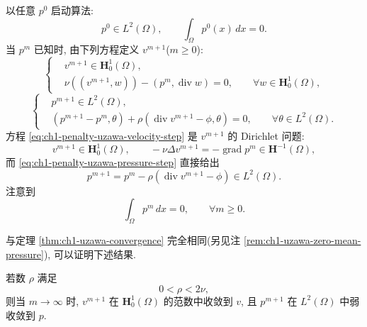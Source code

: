 以任意 $p^0$ 启动算法:
\begin{equation}
p^0\in L^2(\Omega),
\qquad\int_\Omega p^0(x)\,dx=0.
\label{eq:ch1-penalty-algorithm-initial-pressure}
\end{equation}
当 $p^m$ 已知时, 由下列方程定义 $v^{m+1}$($m\geq0$):
\begin{equation}
\left\{
\begin{aligned}
&v^{m+1}\in\mathbf H_0^1(\Omega),\\
&\nu((v^{m+1},w))-(p^m,\operatorname{div}w)=0,
\qquad\forall w\in\mathbf H_0^1(\Omega),
\end{aligned}
\right.
\label{eq:ch1-penalty-uzawa-velocity-step}
\end{equation}
\begin{equation}
\left\{
\begin{aligned}
&p^{m+1}\in L^2(\Omega),\\
&(p^{m+1}-p^m,\theta)
+\rho(\operatorname{div}v^{m+1}-\phi,\theta)=0,
\qquad\forall\theta\in L^2(\Omega).
\end{aligned}
\right.
\label{eq:ch1-penalty-uzawa-pressure-step}
\end{equation}
方程 \eqref{eq:ch1-penalty-uzawa-velocity-step} 是 $v^{m+1}$ 的 Dirichlet 问题:
\begin{equation}
v^{m+1}\in\mathbf H_0^1(\Omega),
\qquad-\nu\Delta v^{m+1}=-\operatorname{grad}p^m
\in\mathbf H^{-1}(\Omega),
\label{eq:ch1-penalty-uzawa-dirichlet-step}
\end{equation}
而 \eqref{eq:ch1-penalty-uzawa-pressure-step} 直接给出
\begin{equation}
p^{m+1}=p^m-\rho(\operatorname{div}v^{m+1}-\phi)
\in L^2(\Omega).
\label{eq:ch1-penalty-uzawa-pressure-update}
\end{equation}
注意到
\begin{equation}
\int_\Omega p^m\,dx=0,
\qquad\forall m\geq0.
\label{eq:ch1-penalty-uzawa-iterates-zero-mean}
\end{equation}

与定理 \ref{thm:ch1-uzawa-convergence} 完全相同(另见注 \ref{rem:ch1-uzawa-zero-mean-pressure}), 可以证明下述结果.

\begin{Theorem}
\label{thm:ch1-penalty-uzawa-convergence}
若数 $\rho$ 满足
\begin{equation}
0<\rho<2\nu,
\label{eq:ch1-penalty-uzawa-step-condition}
\end{equation}
则当 $m\to\infty$ 时, $v^{m+1}$ 在 $\mathbf H_0^1(\Omega)$ 的范数中收敛到 $v$, 且 $p^{m+1}$ 在 $L^2(\Omega)$ 中弱收敛到 $p$.
\end{Theorem}
